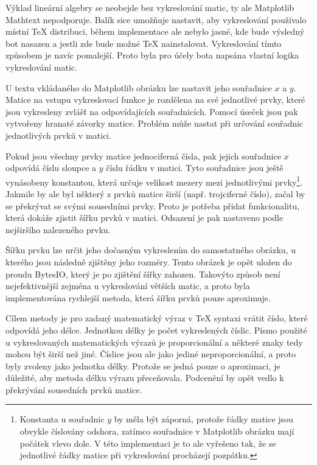 \documentclass[FM]{tulthesis}
\begin{document}
	Výklad lineární algebry se neobejde bez vykreslování matic, ty ale Matplotlib Mathtext nepodporuje. Balík sice umožňuje nastavit, aby vykreslování používalo místní TeX distribuci, během implementace ale nebylo jasné, kde bude výsledný bot nasazen a jestli zde bude možné TeX nainstalovat. Vykreslování tímto způsobem je navíc pomalejší. Proto byla pro účely bota napsána vlastní logika vykreslování matic.
	
	U textu vkládaného do Matplotlib obrázku lze nastavit jeho souřadnice $x$ a $y$. Matice na vstupu vykreslovací funkce je rozdělena na své jednotlivé prvky, které jsou vykresleny zvlášť na odpovídajících souřadnicích. Pomocí úseček jsou pak vytvořeny hranaté závorky matice. Problém může nastat při určování souřadnic jednotlivých prvků v matici.
	
	Pokud jsou všechny prvky matice jednociferná čísla, pak jejich souřadnice $x$ odpovídá číslu sloupce a $y$ číslu řádku v matici. Tyto souřadnice jsou ještě vynásobeny konstantou, která určuje velikost mezery mezi jednotlivými prvky\footnote{Konstanta u souřadnic $y$ by měla být záporná, protože řádky matice jsou obvykle číslovány odshora, zatímco souřadnice v Matplotlib obrázku mají počátek vlevo dole. V této implementaci je to ale vyřešeno tak, že se jednotlivé řádky matice při vykreslování procházejí pozpátku.}. Jakmile by ale byl některý z prvků matice širší (např. trojciferné číslo), začal by se překrývat se svými sousedními prvky. Proto je potřeba přidat funkcionalitu, která dokáže zjistit šířku prvků v matici. Odsazení je pak nastaveno podle nejširšího nalezeného prvku.
	
	Šířku prvku lze určit jeho dočasným vykreslením do samostatného obrázku, u kterého jsou následně zjištěny jeho rozměry. Tento obrázek je opět uložen do proudu BytesIO, který je po zjištění šířky zahozen. Takovýto způsob není nejefektivnější zejména u vykreslování větších matic, a proto byla implementována rychlejší metoda, která šířku prvků pouze aproximuje.

	Cílem metody je pro zadaný matematický výraz v TeX syntaxi vrátit číslo, které odpovídá jeho délce. Jednotkou délky je počet vykreslených číslic. Písmo použité u vykreslovaných matematických výrazů je proporcionální a některé znaky tedy mohou být širší než jiné. Číslice jsou ale jako jediné neproporcionální, a proto byly zvoleny jako jednotka délky. Protože se jedná pouze o aproximaci, je důležité, aby metoda délku výrazu přeceňovala. Podcenění by opět vedlo k překrývání sousedních prvků matice.
		
\end{document}

